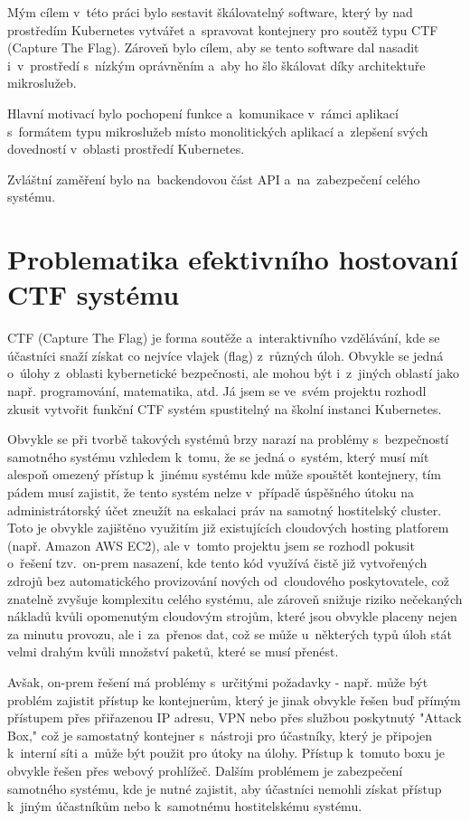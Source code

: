 \documentclass[12pt, a4paper,
oneside,      %
openright
]{report}
\begin{document}
Mým cílem v~této práci bylo sestavit škálovatelný software, který by nad prostředím Kubernetes vytvářet a~spravovat kontejnery pro soutěž typu CTF (Capture The Flag). Zároveň bylo cílem, aby se tento software dal nasadit i~v~prostředí s~nízkým oprávněním a~aby ho šlo škálovat díky architektuře mikroslužeb.

Hlavní motivací bylo pochopení funkce a~komunikace v~rámci aplikací s~formátem typu mikroslužeb místo monolitických aplikací a~zlepšení svých dovedností v~oblasti prostředí Kubernetes.

Zvláštní zaměření bylo na~backendovou část API a~na~zabezpečení celého systému.

\chapter{Problematika efektivního hostovaní CTF systému}
CTF (Capture The Flag) je forma soutěže a~interaktivního vzdělávání, kde se účastníci snaží získat co nejvíce vlajek (flag) z~různých úloh. Obvykle se jedná o~úlohy z~oblasti kybernetické bezpečnosti, ale mohou být i~z~jiných oblastí jako např. programování, matematika, atd. Já jsem se ve~svém projektu rozhodl zkusit vytvořit funkční CTF systém spustitelný na školní instanci Kubernetes. 

Obvykle se při tvorbě takových systémů brzy narazí na problémy s~bezpečností samotného systému vzhledem k~tomu, že se jedná o~systém, který musí mít alespoň omezený přístup k~jinému systému kde může spouštět kontejnery, tím pádem musí zajistit, že tento systém nelze v~případě úspěšného útoku na administrátorský účet zneužít na eskalaci práv na samotný hostitelský cluster. Toto je obvykle zajištěno využitím již existujících cloudových hosting platforem (např. Amazon AWS EC2), ale v~tomto projektu jsem se rozhodl pokusit o~řešení tzv.~on-prem nasazení, kde tento kód využívá čistě již vytvořených zdrojů bez automatického provizování nových od~cloudového poskytovatele, což znatelně zvyšuje komplexitu celého systému, ale zároveň snižuje riziko nečekaných nákladů kvůli opomenutým cloudovým strojům, které jsou obvykle placeny nejen za minutu provozu, ale i~za~přenos dat, což se může u~některých typů úloh stát velmi drahým kvůli množství paketů, které se musí přenést. 

Avšak, on-prem řešení má problémy s~určitými požadavky - např. může být problém zajistit přístup ke kontejnerům, který je jinak obvykle řešen buď přímým přístupem přes přiřazenou IP adresu, VPN nebo přes službou poskytnutý "Attack Box," což je samostatný kontejner s~nástroji pro účastníky, který je připojen k~interní síti a~může být použit pro útoky na úlohy. Přístup k~tomuto boxu je obvykle řešen přes webový prohlížeč. Dalším problémem je zabezpečení samotného systému, kde je nutné zajistit, aby účastníci nemohli získat přístup k~jiným účastníkům nebo k~samotnému hostitelskému systému. 
\end{document}
